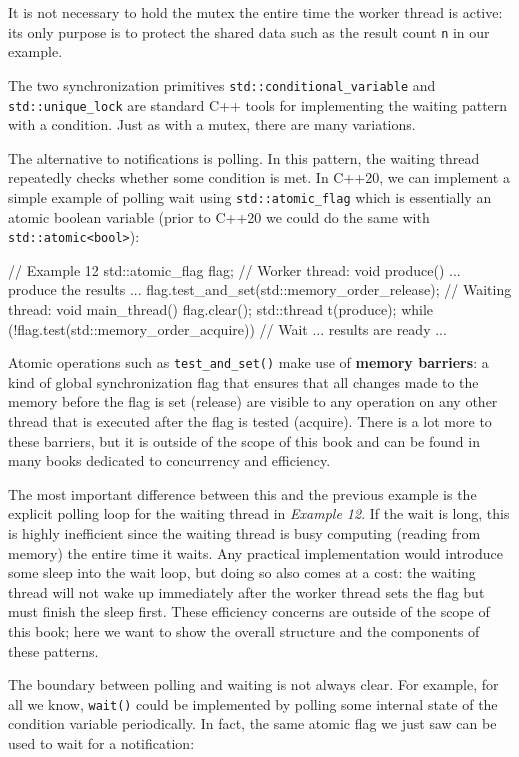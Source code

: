 It is not necessary to hold the mutex the entire time the worker thread is active: its only purpose is to protect the shared data such as the result count \texttt{n} in our example.

The two synchronization primitives \texttt{std::conditional\_variable} and \texttt{std::unique\_lock} are standard C++ tools for implementing the waiting pattern with a condition. Just as with a mutex, there are many variations.

The alternative to notifications is polling. In this pattern, the waiting thread repeatedly checks whether some condition is met. In C++20, we can implement a simple example of polling wait using \texttt{std::atomic\_flag} which is essentially an atomic boolean variable (prior to C++20 we could do the same with \texttt{std::atomic\textless{}bool\textgreater{}}):

\begin{code}
// Example 12
std::atomic_flag flag;
// Worker thread:
void produce() {
  ... produce the results ...
  flag.test_and_set(std::memory_order_release);
}
// Waiting thread:
void main_thread() {
  flag.clear();
  std::thread t(produce);
  while (!flag.test(std::memory_order_acquire)) {} // Wait
  ... results are ready ...
}
\end{code}

Atomic operations such as \texttt{test\_and\_set()} make use of \textbf{memory barriers}: a kind of global synchronization flag that ensures that all changes made to the memory before the flag is set (release) are visible to any operation on any other thread that is executed after the flag is tested (acquire). There is a lot more to these barriers, but it is outside of the scope of this book and can be found in many books dedicated to concurrency and efficiency.

The most important difference between this and the previous example is the explicit polling loop for the waiting thread in \emph{Example 12}. If the wait is long, this is highly inefficient since the waiting thread is busy computing (reading from memory) the entire time it waits. Any practical implementation would introduce some sleep into the wait loop, but doing so also comes at a cost: the waiting thread will not wake up immediately after the worker thread sets the flag but must finish the sleep first. These efficiency concerns are outside of the scope of this book; here we want to show the overall structure and the components of these patterns.

The boundary between polling and waiting is not always clear. For example, for all we know, \texttt{wait()} could be implemented by polling some internal state of the condition variable periodically. In fact, the same atomic flag we just saw can be used to wait for a notification:

